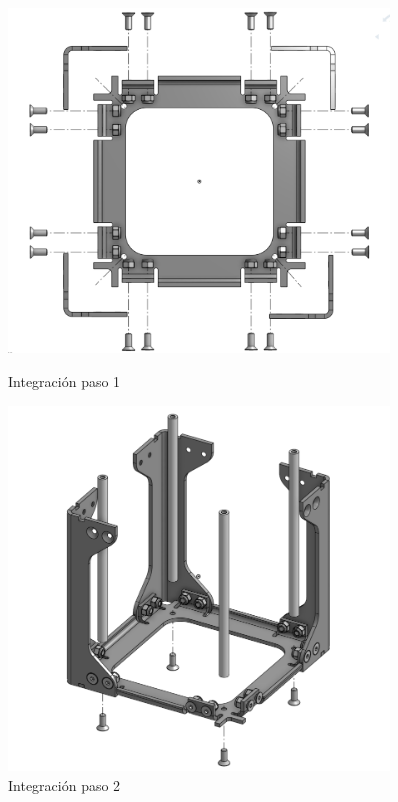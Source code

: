       \begin{figure}[H]
        \begin{minipage}{0.49\textwidth}
          \centering
          \includegraphics[width=0.9\textwidth]{image/structure/integracion1.png}
          \caption{Integración paso 1}
          \label{fig:integracion1}
        \end{minipage}
        \begin{minipage}{0.49\textwidth}
          \centering
          \includegraphics[width=0.9\textwidth]{image/structure/integracion2.png}
          \caption{Integración paso 2}
          \label{fig:integracion2}
        \end{minipage}
      \end{figure}

